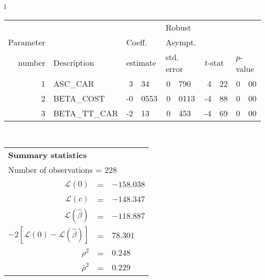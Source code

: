   \begin{tabular}{l}
\begin{tabular}{rlr@{.}lr@{.}lr@{.}lr@{.}l}
         &                       &   \multicolumn{2}{l}{}    & \multicolumn{2}{l}{Robust}  &     \multicolumn{4}{l}{}   \\
Parameter &                       &   \multicolumn{2}{l}{Coeff.}      & \multicolumn{2}{l}{Asympt.}  &     \multicolumn{4}{l}{}   \\
number &  Description                     &   \multicolumn{2}{l}{estimate}      & \multicolumn{2}{l}{std. error}  &   \multicolumn{2}{l}{$t$-stat}  &   \multicolumn{2}{l}{$p$-value}   \\

\hline

1 & ASC\_CAR & 3&34 & 0&790 & 4&22 & 0&00 \\
2 & BETA\_COST & -0&0553 & 0&0113 & -4&88 & 0&00 \\
3 & BETA\_TT\_CAR & -2&13 & 0&453 & -4&69 & 0&00 \\
\hline

\end{tabular}
\\
\begin{tabular}{rcl}
\multicolumn{3}{l}{\bf Summary statistics}\\
\multicolumn{3}{l}{ Number of observations = $228$} \\
 $\mathcal{L}(0)$ &=&  $-158.038$ \\
 $\mathcal{L}(c)$ &=& $-148.347$\\
 $\mathcal{L}(\hat{\beta})$ &=& $-118.887 $  \\
 $-2[\mathcal{L}(0) -\mathcal{L}(\hat{\beta})]$ &=& $78.301$ \\
    $\rho^2$ &=&   $0.248$ \\
    $\bar{\rho}^2$ &=&    $0.229$ \\
\end{tabular}
\end{tabular}

